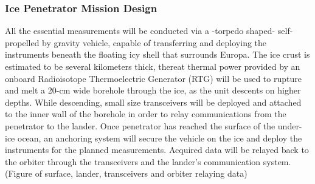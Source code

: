\subsubsection{Ice Penetrator Mission Design}

All the essential measurements will be conducted via a -torpedo shaped- self-propelled by gravity vehicle, capable of transferring and deploying the instruments beneath the floating icy shell that surrounds Europa. The ice crust is estimated to be several kilometers thick, thereat thermal power provided by an onboard Radioisotope Thermoelectric Generator (RTG) will be used to rupture and melt a 20-cm wide borehole through the ice, as the unit descents on higher depths. While descending, small size transceivers will be deployed and attached to the inner wall of the borehole in order to relay communications from the penetrator to the lander. Once penetrator has reached the surface of the under-ice ocean, an anchoring system will secure the vehicle on the ice and deploy the instruments for the planned measurements. Acquired data will be relayed back to the orbiter through the transceivers and the lander’s communication system. 
(Figure of surface, lander, transceivers and orbiter relaying data)

